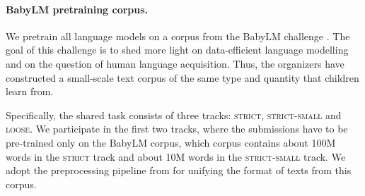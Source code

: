\paragraph{BabyLM pretraining corpus.}

We pretrain all language models on a corpus from the BabyLM challenge \citep{warstadt-et-al-2023-babylm}. The goal of this challenge is to shed more light on data-efficient language modelling and on the question of human language acquisition. Thus, the organizers have constructed a small-scale text corpus of the same type and quantity that children learn from.

Specifically, the shared task consists of three tracks: \textsc{strict}, \textsc{strict-small} and \textsc{loose}. We participate in the first two tracks, where the submissions have to be pre-trained only on the BabyLM corpus, which corpus contains about 100M words in the \textsc{strict} track and about 10M words in the \textsc{strict-small} track. We adopt the preprocessing pipeline from  for unifying the format of texts from this corpus.


